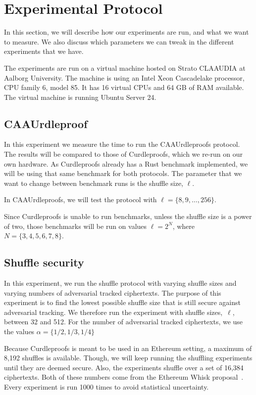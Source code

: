 
\section{Experimental Protocol}\label{sec:experimental-protocol}
In this section, we will describe how our experiments are run, and what we want to measure.
We also discuss which parameters we can tweak in the different experiments that we have.

The experiments are run on a virtual machine hosted on Strato CLAAUDIA at Aalborg University.
The machine is using an Intel Xeon Cascadelake processor, CPU family 6, model 85.
It has 16 virtual CPUs and 64 GB of RAM available.
The virtual machine is running Ubuntu Server 24.


\subsection{CAAUrdleproof}\label{sec:CAAUrdleproof-experiment}
In this experiment we measure the time to run the CAAUrdleproofs protocol.
The results will be compared to those of Curdleproofs, which we re-run on our own hardware.
As Curdleproofs already has a Rust benchmark implemented, we will be using that same benchmark for both protocols.
The parameter that we want to change between benchmark runs is the shuffle size, $\ell$.

In CAAUrdleproofs, we will test the protocol with $\ell=\{8,9,\dots,256\}$.

Since Curdleproofs is unable to run benchmarks, unless the shuffle size is a power of two, those benchmarks will be run on values $\ell=2^N$, where $N=\{3,4,5,6,7,8\}$.




\subsection{Shuffle security}\label{subsec:experimental-protocol-shuffle-security}
In this experiment, we run the shuffle protocol with varying shuffle sizes and varying numbers of adversarial tracked ciphertexts.
The purpose of this experiment is to find the lowest possible shuffle size that is still secure against adversarial tracking.
We therefore run the experiment with shuffle sizes,~$\ell$, between 32 and 512.
For the number of adversarial tracked ciphertexts, we use the values $\alpha=\{1/2,1/3,1/4\}$

Because Curdleproofs is meant to be used in an Ethereum setting, a maximum of 8,192 shuffles is available.
Though, we will keep running the shuffling experiments until they are deemed secure.
Also, the experiments shuffle over a set of 16,384 ciphertexts.
Both of these numbers come from the Ethereum Whisk proposal~\cite{Whisk2024}.
Every experiment is run 1000 times to avoid statistical uncertainty.